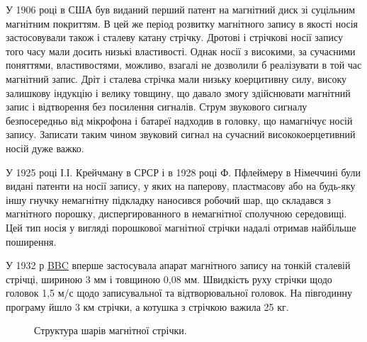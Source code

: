 \documentclass[a4paper,14pt]{extreport}
\begin{document}
  У 1906 році в США був виданий перший патент на магнітний диск зі суцільним магнітним покриттям. В цей же період розвитку
  магнітного запису в якості носія застосовували також і сталеву катану стрічку\cite{lit1}. Дротові і стрічкові носії запису того часу мали досить низькі властивості. Однак носії з високими, за сучасними поняттями, властивостями, можливо, взагалі не дозволили б реалізувати в той час магнітний запис. Дріт і сталева стрічка мали низьку коерцитивну силу, високу залишкову індукцію і велику товщину, що давало
  змогу здійснювати магнітний запис і відтворення без посилення сигналів. Струм звукового сигналу безпосередньо від мікрофона і батареї
  надходив в головку, що намагнічує носій запису. Записати таким чином звуковий сигнал на сучасний висококоерцетивний носій дуже важко.\par
  
  У 1925 році І.І. Крейчману в СРСР і в 1928 році Ф. Пфлеймеру в Німеччині були видані патенти на носії запису, у яких на паперову,
  пластмасову або на будь-яку іншу гнучку немагнітну підкладку наносився робочий шар, що складався з магнітного порошку,
  диспергированного в немагнітної сполучною середовищі. Цей тип носія у вигляді порошкової магнітної стрічки надалі отримав найбільше
  поширення.\par

  У 1932 р \href{https://ru.wikipedia.org/wiki/%D0%91%D0%B8-%D0%B1%D0%B8-%D1%81%D0%B8}{BBC} вперше застосувала апарат магнітного запису на тонкій сталевій стрічці, шириною 3 мм і товщиною 0,08 мм. Швидкість руху стрічки щодо головок 1,5 м/с щодо записувальної та відтворювальної головок. На півгодинну програму йшло 3 км стрічки, а котушка з стрічкою важила 25 кг.\par
  \vspace{0.5cm}
   \begin{figure}[h]
    \caption{Структура шарів магнітної стрічки.}
    \label{ris1}
  \end{figure}
\end{document}
